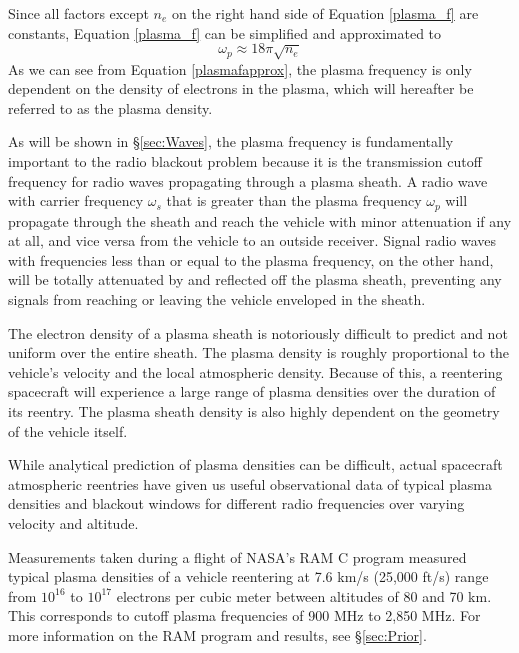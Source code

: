 \documentclass[twocolumn]{article}
\begin{document}
Since all factors except $n_e$ on the right hand side of  Equation \ref{plasma_f} are constants, Equation \ref{plasma_f} can be simplified and approximated to
\begin{equation} \label{plasmafapprox}
\omega_p \approx 18\pi\sqrt{n_e}
\end{equation}
As we can see from Equation \ref{plasmafapprox}, the plasma frequency is only dependent on the density of electrons in the plasma, which will hereafter be referred to as the plasma density.

As will be shown in \S\ref{sec:Waves}, the plasma frequency is fundamentally important to the radio blackout problem because it is the transmission cutoff frequency for radio waves propagating through a plasma sheath.
A radio wave with carrier frequency $\omega_s$ that is greater than the plasma frequency $\omega_p$ will propagate through the sheath and reach the vehicle with minor attenuation if any at all, and vice versa from the vehicle to an outside receiver.
Signal radio waves with frequencies less than or equal to the plasma frequency, on the other hand, will be totally attenuated by and reflected off the plasma sheath, preventing any signals from reaching or leaving the vehicle enveloped in the sheath.

The electron density of a plasma sheath is notoriously difficult to predict and not uniform over the entire sheath.
The plasma density is roughly proportional to the vehicle's velocity and the local atmospheric density.
Because of this, a reentering spacecraft will experience a large range of plasma densities over the duration of its reentry.
The plasma sheath density is also highly dependent on the geometry of the vehicle itself.


While analytical prediction of plasma densities can be difficult, actual spacecraft atmospheric reentries have given us useful observational data of typical plasma densities and blackout windows for different radio frequencies over varying velocity and altitude.

Measurements taken during a flight of NASA's RAM C program measured typical plasma densities of a vehicle reentering at 7.6 km/s (25,000 ft/s) range from $10^{16}$ to $10^{17}$ electrons per cubic meter between altitudes of 80 and 70 km.\cite{akey_radio_1970}
This corresponds to cutoff plasma frequencies of 900 MHz to 2,850 MHz.
For more information on the RAM program and results, see \S\ref{sec:Prior}.
\end{document}

